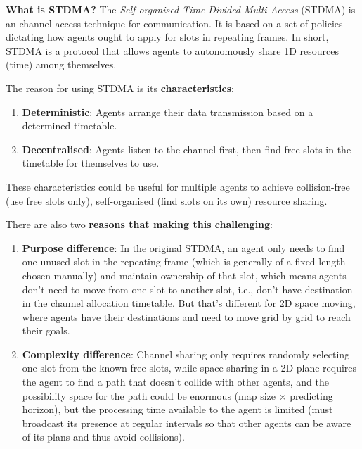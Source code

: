 \label{sec:Why STDMA?}

\textbf{What is STDMA?} The \textit{Self-organised Time Divided Multi Access} (STDMA)
 is an channel access technique for communication. 
 It is based on a set of policies dictating how agents ought to apply for
  slots in repeating frames. 
  In short, STDMA is a protocol that allows agents to autonomously
   share 1D resources (time) among themselves.


The reason for using STDMA is its \textbf{characteristics}:

\begin{enumerate}
    \item \textbf{Deterministic}: Agents arrange their data transmission based on a determined timetable.
    \item \textbf{Decentralised}: Agents listen to the channel first, then find free slots in the timetable for themselves to use.
\end{enumerate}

These characteristics could be useful for multiple agents to achieve collision-free (use free slots only),
 self-organised (find slots on its own) resource sharing.

There are also two \textbf{reasons that making this challenging}: 

\begin{enumerate}
    \item \textbf{Purpose difference}: In the original STDMA, an agent only needs to find one unused slot
    in the repeating frame (which is generally of a fixed length chosen manually) and maintain ownership of that slot,
    which means agents don't need to move from one slot to another slot, i.e., don't have destination in the channel allocation timetable. 
    But that's different for 2D space moving, where agents have their destinations and need to move grid by grid to reach their goals.
    \item \textbf{Complexity difference}: Channel sharing only requires randomly selecting one slot from the known free slots, while space sharing in
     a 2D plane requires the agent to find a path that doesn't collide with other agents, and the possibility space for the path could be enormous
      (map size $\times$ predicting horizon), but the processing time available to the agent is limited
       (must broadcast its presence at regular intervals so that other agents can be aware of its plans and thus avoid collisions).
\end{enumerate}



